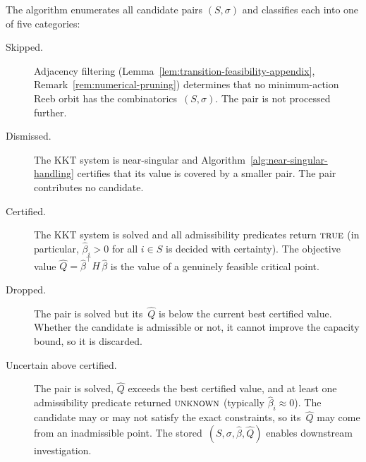 %
%
%

The algorithm enumerates all candidate pairs $(S, \sigma)$
and classifies each into one of five categories:
\begin{description}
\item[Skipped.]
  Adjacency filtering
  (Lemma~\ref{lem:transition-feasibility-appendix},
  Remark~\ref{rem:numerical-pruning})
  determines that no minimum-action Reeb orbit has
  the combinatorics~$(S, \sigma)$.
  The pair is not processed further.
\item[Dismissed.]
  The KKT system is near-singular and
  Algorithm~\ref{alg:near-singular-handling} certifies
  that its value is covered by a smaller pair.
  The pair contributes no candidate.
\item[Certified.]
  The KKT system is solved and all admissibility
  predicates return $\textsc{true}$
  (in particular, $\hat\beta_i > 0$ for all $i \in S$
  is decided with certainty).
  The objective value
  $\hat Q = \hat\beta^\top H\,\hat\beta$
  is the value of a genuinely feasible critical point.
\item[Dropped.]
  The pair is solved but its~$\hat Q$ is below
  the current best certified value.
  Whether the candidate is admissible or not,
  it cannot improve the capacity bound,
  so it is discarded.
\item[Uncertain above certified.]
  The pair is solved, $\hat Q$ exceeds the best
  certified value, and at least one admissibility
  predicate returned $\textsc{unknown}$
  (typically $\hat\beta_i \approx 0$).
  The candidate may or may not satisfy the exact
  constraints, so its~$\hat Q$ may come from
  an inadmissible point.
  The stored~$(S, \sigma, \hat\beta, \hat Q)$ enables
  downstream investigation.
\end{description}

